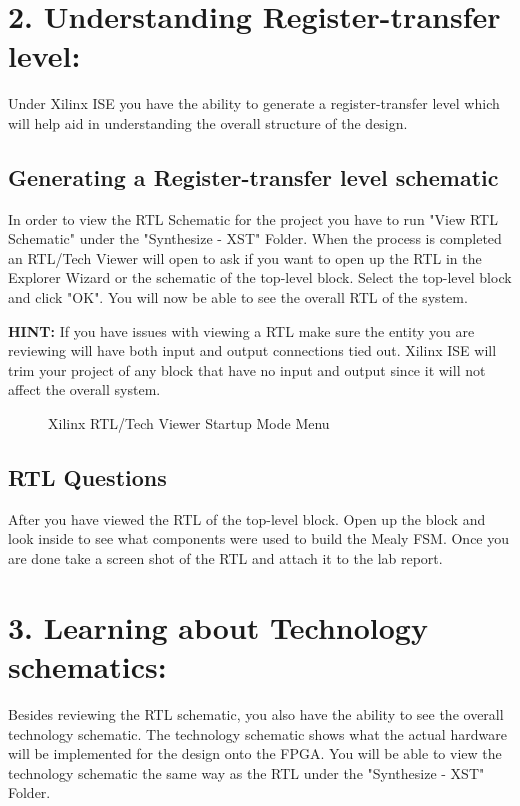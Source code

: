 \documentclass{article}
\begin{document}
\newpage

\section{2. Understanding Register-transfer level:}
Under Xilinx ISE you have the ability to generate a register-transfer level which will help aid in understanding the overall structure of the design.

\subsection{Generating a Register-transfer level schematic}
In order to view the RTL Schematic for the project you have to run "View RTL Schematic" under the "Synthesize - XST" Folder. When the process is completed an RTL/Tech Viewer will open to ask if you want to open up the RTL in the Explorer Wizard or the schematic of the top-level block. Select the top-level block and click "OK". You will now be able to see the overall RTL of the system. 

\textbf{HINT:} If you have issues with viewing a RTL make sure the entity you are reviewing will have both input and output connections tied out. Xilinx ISE will trim your project of any block that have no input and output since it will not affect the overall system.

\begin{figure}[!htb]
  \centering
  \caption{Xilinx RTL/Tech Viewer Startup Mode Menu }
\end{figure}

\subsection{RTL Questions}
After you have viewed the RTL of the top-level block. Open up the block and look inside to see what components were used to build the Mealy FSM. Once you are done take a screen shot of the RTL and attach it to the lab report.

\newpage

\section{3. Learning about Technology schematics:}
Besides reviewing the RTL schematic, you also have the ability to see the overall technology schematic. The technology schematic shows what the actual hardware will be implemented for the design onto the FPGA. You will be able to view the technology schematic the same way as the RTL under the "Synthesize - XST" Folder.
\end{document}
